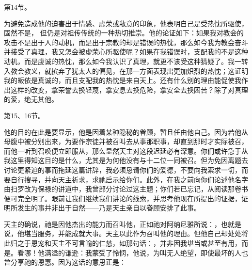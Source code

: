 第14节。 \par

为避免造成他的迫害出于情感、虚荣或敌意的印象，他表明自己是受热忱所驱使，固然不是， 但仍是对祖传传统的一种热切推崇。他的论证如下：如果我对教会的攻击不是出于人的动机，而是出于宗教的却是错误的热忱，那么如今我为教会奋斗并接受了真理，我又怎会被虚荣心所驱使呢？如果在我错误时，支配我的不是这种动机，而是虔诚的热忱，那么如今我认识了真理，就更不该受这种猜疑了。我一转入教会教义，就摈弃了犹太人的偏见，在那一方面表现出更加炽烈的热忱；这证明我的皈依是真诚的，而且支配我的热忱是来自天上。还有什么别的理由能促使我作出这样的改变，拿荣誉去换轻蔑，拿安息去换危险，拿安全去换困苦？除了对真理的爱，绝无其他。\par

第15、16节。\par

他的目的在此是要显示，他是因着某种隐秘的眷顾，暂且任由他自己。因为若他从母腹中被分别出来，为要作宗徒并被召叫去从事那职事，却直到那时才实际被召，而他一听到召唤便立即服从，那么显然天主对这段迟延必有深意。你们或许急于从我这里得知这目的是什么，尤其是为何他没有与十二位一同被召。但为免因离题去讨论更紧迫的事而拖延这篇讲辞，我必须恳请你们的爱德，不要向我索求一切，而要自行搜寻，并向天主祈求，求祂启示给你们。此外，在我之前向你们论述他名字由扫罗改为保禄的讲道中，我曾部分讨论过这主题；你们若已忘记，从阅读那卷书便可完全明了。眼前让我们继续我们讲论的线索，并思考他现在所提出的证据，证明所发生的事并非出于自然——乃是天主亲自以眷顾安排了此事。\par

\par

天主的确说，祂是因他杰出的能力而召叫他，正如祂对阿纳尼雅所说：，也就是说，他堪当服务，并能成就大事。天主以此作为召叫他的理由。但他自己却处处将此归之于恩宠和天主不可言喻的仁慈，如那句话：，并非因我堪当或甚至有用，而是。看哪！他满溢的谦逊：我蒙受了怜悯，他说，为叫无人绝望，即使最坏的人也曾分享祂的恩惠。因为这话的意思正是：\par

